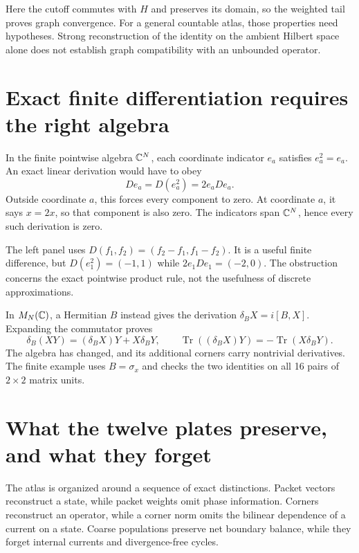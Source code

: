 Here the cutoff commutes with $H$ and preserves its domain, so the weighted tail proves graph convergence. For a general countable atlas, those properties need hypotheses. Strong reconstruction of the identity on the ambient Hilbert space alone does not establish graph compatibility with an unbounded operator.



\clearpage
\section{Exact finite differentiation requires the right algebra}

In the finite pointwise algebra $\mathbb C^N$, each coordinate indicator $e_a$ satisfies $e_a^2=e_a$. An exact linear derivation would have to obey
\[
De_a=D(e_a^2)=2e_aDe_a.
\]
Outside coordinate $a$, this forces every component to zero. At coordinate $a$, it says $x=2x$, so that component is also zero. The indicators span $\mathbb C^N$, hence every such derivation is zero.

The left panel uses $D(f_1,f_2)=(f_2-f_1,f_1-f_2)$. It is a useful finite difference, but $D(e_1^2)=(-1,1)$ while $2e_1De_1=(-2,0)$. The obstruction concerns the exact pointwise product rule, not the usefulness of discrete approximations.

In $M_N(\mathbb C)$, a Hermitian $B$ instead gives the derivation $\delta_BX=i[B,X]$. Expanding the commutator proves
\[
\delta_B(XY)=(\delta_BX)Y+X\delta_BY,
\qquad
\operatorname{Tr}((\delta_BX)Y)=-\operatorname{Tr}(X\delta_BY).
\]
The algebra has changed, and its additional corners carry nontrivial derivatives. The finite example uses $B=\sigma_x$ and checks the two identities on all 16 pairs of $2\times2$ matrix units.



\clearpage
\section{What the twelve plates preserve, and what they forget}

The atlas is organized around a sequence of exact distinctions. Packet vectors reconstruct a state, while packet weights omit phase information. Corners reconstruct an operator, while a corner norm omits the bilinear dependence of a current on a state. Coarse populations preserve net boundary balance, while they forget internal currents and divergence-free cycles.

